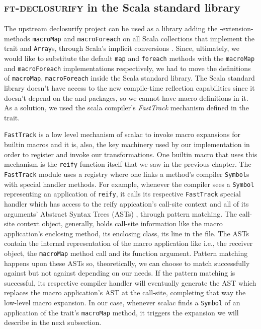 \subsection{\textsc{ft-declosurify} in the Scala standard library}

The upstream declosurify project can be used as a library adding the -extension-
methods \texttt{macroMap} and \texttt{macroForeach} on all Scala collections that implement the
 trait and \texttt{Array}s, through Scala's implicit
conversions . Since, ultimately, we would like to
substitute the default \texttt{map} and \texttt{foreach} methods with the \texttt{macroMap} and
\texttt{macroForeach} implementations respectively, we had to move the definitions
of \texttt{macroMap}, \texttt{macroForeach} inside the Scala standard library. The Scala standard
library doesn't have access to the new compile-time reflection capabilities
since it doesn't depend on the  and  packages, so we
cannot have macro definitions in it. As a solution, we used the scala compiler's
\emph{FastTrack} mechanism defined in the  trait.

\texttt{FastTrack} is a low level mechanism of scalac to invoke macro
expansions for builtin macros and it is, also, the key machinery used by our
implementation in order to register and invoke our transformations. One builtin
macro that uses this mechanism is the \texttt{reify} function itself that we saw in the
previous chapter. The \texttt{FastTrack} module uses a registry where one links a
method's compiler \texttt{Symbol}s with special handler methods. For example, whenever
the compiler sees a \texttt{Symbol} representing an application of \texttt{reify}, it calls its
respective \texttt{FastTrack} special handler which has access to the reify appication's
call-site context and all of  its arguments' Abstract Syntax Trees (ASTs) ,
through pattern matching. The call-site context object, generally, holds
call-site information like the macro application's enclosing method, its
enclosing class, its line in the file. The ASTs contain the internal
representation of the macro application like 
i.e., the receiver object, the \texttt{macroMap} method call and its function argument.
Pattern matching happens upon these ASTs so, theoretically, we can choose to
match successfully against  but not against  depending on our needs. If the pattern
matching is successful, its respective compiler handler will eventually generate
the AST which replaces the macro application's AST at the call-site, completing
that way the low-level macro expansion. In our case, whenever scalac finds a
\texttt{Symbol} of an application of the  trait's
\texttt{macroMap} method, it triggers the expansion we will describe in the next
subsection.

